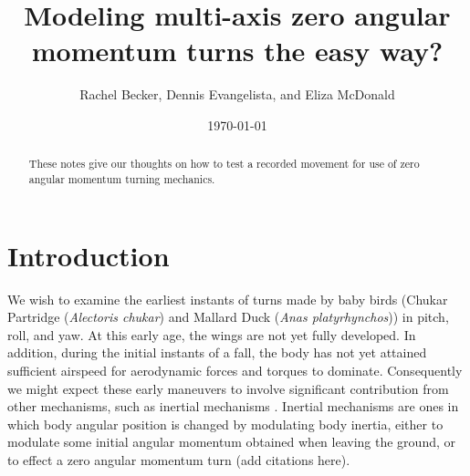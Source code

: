 \documentclass{amsart}
\title{Modeling multi-axis zero angular momentum turns the easy way?}
\author{Rachel Becker, Dennis Evangelista, and Eliza McDonald}
\date{\today}
\begin{document}
\begin{abstract}
These notes give our thoughts on how to test a recorded movement for use of zero angular momentum turning mechanics. 
\end{abstract}
\maketitle
\tableofcontents

\section{Introduction}
We wish to examine the earliest instants of turns made by baby birds (Chukar Partridge (\emph{Alectoris chukar}) and Mallard Duck (\emph{Anas platyrhynchos})) in pitch, roll, and yaw.  At this early age, the wings are not yet fully developed.  In addition, during the initial instants of a fall, the body has not yet attained sufficient airspeed for aerodynamic forces and torques to dominate.  Consequently we might expect these early maneuvers to involve significant contribution from other mechanisms, such as inertial mechanisms \cite{Jusufi:2008, Jusufi:2010}.  Inertial mechanisms are ones in which body angular position is changed by modulating body inertia, either to modulate some initial angular momentum obtained when leaving the ground, or to effect a zero angular momentum turn (add citations here).  
\end{document}

